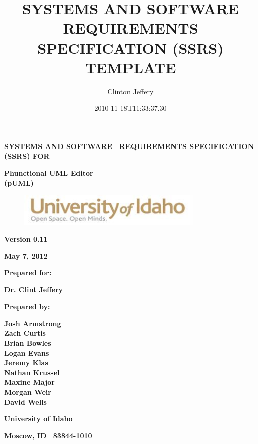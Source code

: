 \documentclass[twoside,letterpaper]{article}
\title{SYSTEMS AND SOFTWARE REQUIREMENTS SPECIFICATION (SSRS) TEMPLATE}
\author{Clinton Jeffery}
\date{2010-11-18T11:33:37.30}
\begin{document}
\clearpage
{\centering\bfseries
SYSTEMS AND SOFTWARE \ REQUIREMENTS SPECIFICATION (SSRS) FOR
\par}


\bigskip

{\centering\bfseries Phunctional UML Editor \\(pUML)
\par}


\bigskip


\bigskip


\bigskip

\begin{figure}
\centering
\includegraphics[width=3.5in]{uidahologo.jpg}
\end{figure}

\bigskip


\bigskip

{\centering\bfseries Version 0.11 
\par}

{\centering\bfseries May 7, 2012 
\par}


\bigskip


\bigskip

{\centering\bfseries Prepared for: 
\par}

{\centering\bfseries Dr. Clint Jeffery
\par}

\bigskip


\bigskip

{\centering\bfseries Prepared by:
\par}

{\centering\bfseries
Josh Armstrong
\\Zach Curtis
\\Brian Bowles
\\Logan Evans
\\Jeremy Klas
\\Nathan Krussel
\\Maxine Major
\\Morgan Weir
\\David Wells
\par}

{\centering\bfseries University of Idaho \par}

{\centering\bfseries Moscow, ID \ 83844-1010 \par}
\end{document}
